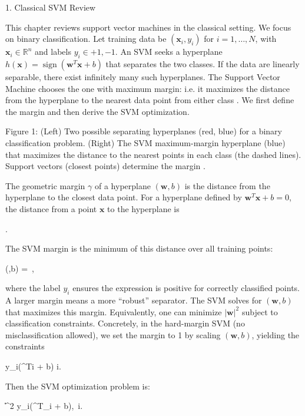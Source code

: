 1. Classical SVM Review





This chapter reviews support vector machines in the classical setting.  We focus on binary classification.  Let training data be $(\mathbf{x}_i,y_i)$ for $i=1,\dots,N$, with $\mathbf{x}_i\in\mathbb{R}^n$ and labels $y_i\in{+1,-1}$.  An SVM seeks a hyperplane $h(\mathbf{x}) = \operatorname{sign}(\mathbf{w}^T \mathbf{x} + b)$ that separates the two classes.  If the data are linearly separable, there exist infinitely many such hyperplanes.  The Support Vector Machine chooses the one with maximum margin: i.e. it maximizes the distance from the hyperplane to the nearest data point from either class .  We first define the margin and then derive the SVM optimization.



Figure 1: (Left) Two possible separating hyperplanes (red, blue) for a binary classification problem. (Right) The SVM maximum-margin hyperplane (blue) that maximizes the distance to the nearest points in each class (the dashed lines). Support vectors (closest points) determine the margin .



The geometric margin $\gamma$ of a hyperplane $(\mathbf{w},b)$ is the distance from the hyperplane to the closest data point.  For a hyperplane defined by $\mathbf{w}^T\mathbf{x}+b=0$, the distance from a point $\mathbf{x}$ to the hyperplane is

\;.

The SVM margin is the minimum of this distance over all training points:

\gamma(,b) \;=\; \,\;,

where the label $y_i$ ensures the expression is positive for correctly classified points.  A larger margin means a more “robust” separator.  The SVM solves for $(\mathbf{w},b)$ that maximizes this margin.  Equivalently, one can minimize $|\mathbf{w}|^2$ subject to classification constraints.  Concretely, in the hard-margin SVM (no misclassification allowed), we set the margin to 1 by scaling $(\mathbf{w},b)$, yielding the constraints

y_i(^Ti + b)  \quad{}i.

Then the SVM optimization problem is:

\;\|\|^2 \quad{}y_i(^T_i + b),\ \forall i.

